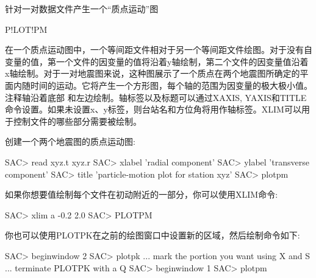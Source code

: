 \label{cmd:plotpm}

针对一对数据文件产生一个``质点运动''图

\begin{SACSTX}
P!LOT!PM
\end{SACSTX}

在一个质点运动图中，一个等间距文件相对于另一个等间距文件绘图。对于没有自变量的值，第一个文件的因变量的值将沿着y轴绘制，第二个文件的因变量值沿着x轴绘制。对于一对地震图来说，这种图展示了一个质点在两个地震图所确定的平面内随时间的运动。它将产生一个方形图，每个轴的范围为因变量的极大极小值。注释轴沿着底部	和左边绘制。轴标签以及标题可以通过XAXIS, YAXIS和TITLE命令设置。如果未设置x、y标签，则台站名和方位角将用作轴标签。XLIM可以用于控制文件的哪些部分需要被绘制。

创建一个两个地震图的质点运动图:
\begin{SACCode}
SAC> read xyz.t xyz.r
SAC> xlabel 'radial component'
SAC> ylabel 'transverse component'
SAC> title 'particle-motion plot for station xyz'
SAC> plotpm
\end{SACCode}

如果你想要值绘制每个文件在初动附近的一部分，你可以使用XLIM命令:
\begin{SACCode}
SAC> xlim a -0.2 2.0
SAC> PLOTPM
\end{SACCode}

你也可以使用PLOTPK在之前的绘图窗口中设置新的区域，然后绘制命令如下:
\begin{SACCode}
SAC> beginwindow 2
SAC> plotpk
 ... mark the portion you want using X and S
 ... terminate PLOTPK with a Q
SAC> beginwindow 1
SAC> plotpm
\end{SACCode}
